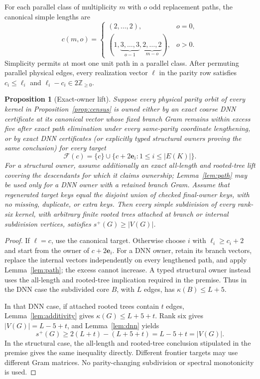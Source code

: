 \documentclass[11pt]{article}
\newtheorem{proposition}[theorem]{Proposition}
\theoremstyle{definition}
\theoremstyle{remark}
\newcommand{\spn}{s^+}
\begin{document}
For each parallel class of multiplicity $m$ with $o$ odd replacement paths,
the canonical simple lengths are
\[
 c(m,o)=
 \begin{cases}
 (2,\ldots,2),&o=0,\\
 (1,\underbrace{3,\ldots,3}_{o-1},
       \underbrace{2,\ldots,2}_{m-o}),&o>0.
 \end{cases}
\]
Simplicity permits at most one unit path in a parallel class.  After permuting
parallel physical edges, every realization vector $\ell$ in the parity row
satisfies $c_i\le\ell_i$ and $\ell_i-c_i\in2\mathbb Z_{\ge0}$.

\begin{proposition}[Exact-owner lift]
\label{prop:owner-interface}
Suppose every physical parity orbit of every kernel in
Proposition~\ref{prop:census} is owned either by an exact coarse DNN certificate
at its canonical vector whose fixed branch Gram remains within excess five
after exact path elimination under every same-parity coordinate lengthening,
or by exact DNN certificates (or explicitly typed structural owners proving
the same conclusion) for every target
\[
 \mathcal F(c)=\{c\}\cup\{c+2\mathbf e_i:1\le i\le|E(K)|\}.
\]
For a structural owner, assume additionally an exact all-length and rooted-tree
lift covering the descendants for which it claims ownership;
Lemma~\ref{lem:path} may be used only for a DNN owner with a retained branch
Gram.  Assume that regenerated target keys equal the disjoint union of checked
final-owner keys, with no missing, duplicate, or extra keys.  Then every simple
subdivision of every rank-six kernel, with arbitrary
finite rooted trees attached at branch or internal subdivision vertices,
satisfies $\spn(G)\ge|V(G)|$.
\end{proposition}
\begin{proof}
If $\ell=c$, use the canonical target.  Otherwise choose $i$ with
$\ell_i\ge c_i+2$ and start from the owner of $c+2\mathbf e_i$.  For a DNN
owner, retain its branch vectors, replace the internal vectors independently
on every lengthened path, and apply Lemma~\ref{lem:path}; the excess cannot
increase.  A typed structural owner instead uses the all-length and rooted-tree
implication required in the premise.  Thus in the DNN case the subdivided core
$B$, with $L$ edges, has $\kappa(B)\le L+5$.

In that DNN case, if attached rooted trees contain $t$ edges,
Lemma~\ref{lem:additivity} gives
$\kappa(G)\le L+5+t$.  Rank six gives $|V(G)|=L-5+t$, and
Lemma~\ref{lem:dnn} yields
\[
 \spn(G)\ge2(L+t)-(L+5+t)=L-5+t=|V(G)|.
\]
In the structural case, the all-length and rooted-tree conclusion stipulated
in the premise gives the same inequality directly.
Different frontier targets may use different Gram matrices.  No parity-changing
subdivision or spectral monotonicity is used.
\end{proof}
\end{document}
